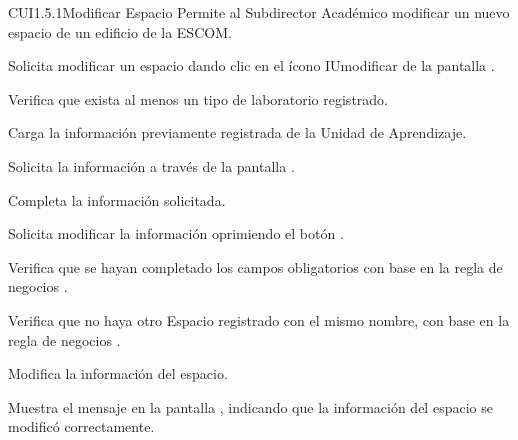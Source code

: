 \begin{UseCase}{CUI1.5.1}{Modificar Espacio}{	
	Permite al Subdirector Académico modificar un nuevo espacio de un edificio de la ESCOM.
}
	
\end{UseCase}

\begin{UCtrayectoria}
	\UCpaso [\UCactor] Solicita modificar un espacio dando clic en el ícono  IUmodificar 
	de la pantalla . 
	
	\UCpaso [\UCsist] Verifica que exista al menos un tipo de laboratorio registrado. 

	\UCpaso [\UCsist] Carga la información previamente registrada de la Unidad de Aprendizaje.

	\UCpaso[\UCsist] Solicita la información a través de la pantalla .
	
	\UCpaso [\UCactor] Completa la información solicitada. \label{CUI1.5.1:CompletaInfo}
	
	\UCpaso [\UCactor] Solicita modificar la información oprimiendo el botón . 
	
	\UCpaso [\UCsist] Verifica que se hayan completado los campos obligatorios con base en la regla de negocios . 
		
	\UCpaso [\UCsist] Verifica que no haya otro Espacio registrado con el mismo nombre, con base en la regla de negocios . 
	
	\UCpaso [\UCsist] Modifica la información del espacio.
	
	\UCpaso [\UCsist] Muestra el mensaje  en la pantalla , indicando que la información del espacio se modificó correctamente.	
	
\end{UCtrayectoria}

